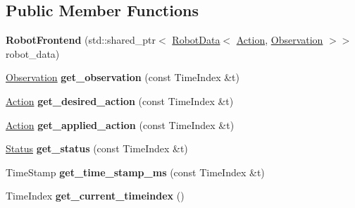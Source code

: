\subsection*{Public Member Functions}
\begin{DoxyCompactItemize}
\item 
{\bfseries Robot\+Frontend} (std\+::shared\+\_\+ptr$<$ \hyperlink{classrobot__interfaces_1_1RobotData}{Robot\+Data}$<$ \hyperlink{classAction}{Action}, \hyperlink{classObservation}{Observation} $>$$>$ robot\+\_\+data)\hypertarget{classrobot__interfaces_1_1RobotFrontend_a0bd84764fb1a3004282706963aa48c3e}{}\label{classrobot__interfaces_1_1RobotFrontend_a0bd84764fb1a3004282706963aa48c3e}

\item 
\hyperlink{classObservation}{Observation} {\bfseries get\+\_\+observation} (const Time\+Index \&t)\hypertarget{classrobot__interfaces_1_1RobotFrontend_a7628a6f8d6858bb42565ad3577b9d5f0}{}\label{classrobot__interfaces_1_1RobotFrontend_a7628a6f8d6858bb42565ad3577b9d5f0}

\item 
\hyperlink{classAction}{Action} {\bfseries get\+\_\+desired\+\_\+action} (const Time\+Index \&t)\hypertarget{classrobot__interfaces_1_1RobotFrontend_ad9cf328a6a438cf40df1944c1772fca8}{}\label{classrobot__interfaces_1_1RobotFrontend_ad9cf328a6a438cf40df1944c1772fca8}

\item 
\hyperlink{classAction}{Action} {\bfseries get\+\_\+applied\+\_\+action} (const Time\+Index \&t)\hypertarget{classrobot__interfaces_1_1RobotFrontend_a52f915a23cd37e4c108080ed5cba674a}{}\label{classrobot__interfaces_1_1RobotFrontend_a52f915a23cd37e4c108080ed5cba674a}

\item 
\hyperlink{structrobot__interfaces_1_1Status}{Status} {\bfseries get\+\_\+status} (const Time\+Index \&t)\hypertarget{classrobot__interfaces_1_1RobotFrontend_a48eff6e33cdafa175e8e311296aacfec}{}\label{classrobot__interfaces_1_1RobotFrontend_a48eff6e33cdafa175e8e311296aacfec}

\item 
Time\+Stamp {\bfseries get\+\_\+time\+\_\+stamp\+\_\+ms} (const Time\+Index \&t)\hypertarget{classrobot__interfaces_1_1RobotFrontend_abaf909237a40a0da1839d5e341ad572b}{}\label{classrobot__interfaces_1_1RobotFrontend_abaf909237a40a0da1839d5e341ad572b}

\item 
Time\+Index {\bfseries get\+\_\+current\+\_\+timeindex} ()\hypertarget{classrobot__interfaces_1_1RobotFrontend_a3d74aa3bd15ab0baef5d011f06aad7e7}{}\label{classrobot__interfaces_1_1RobotFrontend_a3d74aa3bd15ab0baef5d011f06aad7e7}


\end{DoxyCompactItemize}

